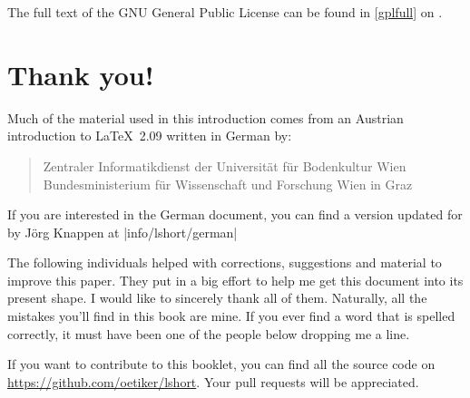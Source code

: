 \begin{small}
  \noindent The full text of the GNU General Public License can be found in
  \autoref{gplfull} on .
\end{small}

\chapter{Thank you!}
\noindent Much of the material used in this introduction comes from an
Austrian introduction to \LaTeX\ 2.09 written in German by:
\begin{verse}
  {Zentraler Informatikdienst der Universit\"at f\"ur Bodenkultur Wien}
  {Bundesministerium f\"ur Wissenschaft und Forschung Wien}
  {in Graz}
\end{verse}

If you are interested in the German document, you can find a version
updated for \LaTeXe{} by J\"org Knappen at
\CTAN|info/lshort/german|

\newpage \noindent The
following individuals helped with corrections, suggestions and
material to improve this paper. They put in a big effort to help me
get this document into its present shape. I would like to
sincerely thank all of them. Naturally, all the mistakes you'll find
in this book are mine. If you ever find a word that is spelled
correctly, it must have been one of the people below dropping me a
line.

If you want to contribute to this booklet, you can find all the source code
on \url{https://github.com/oetiker/lshort}. Your pull requests will be
appreciated.

